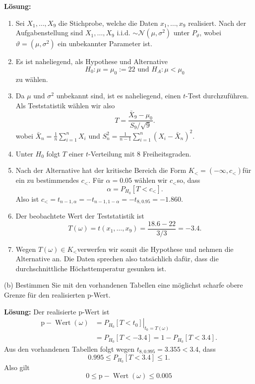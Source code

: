\textbf{Lösung:}
\begin{enumerate}[label=\roman*]
	\item Sei $X_{1}, \ldots, X_{9}$ die Stichprobe, welche die Daten $x_{1}, \ldots, x_{9}$ realisiert. Nach der Aufgabenstellung sind $X_{1}, \ldots, X_{9}$ i.i.d. $\sim \mathcal{N}\left(\mu, \sigma^{2}\right)$ unter $P_{\vartheta}$, wobei $\vartheta=\left(\mu, \sigma^{2}\right)$ ein unbekannter Parameter ist.
	\item Es ist naheliegend, als Hypothese und Alternative
$$
H_{0}: \mu=\mu_{0}:=22 \text { und } H_{A}: \mu<\mu_{0}
$$
zu wählen.
	\item Da $\mu$ und $\sigma^{2}$ unbekannt sind, ist es naheliegend, einen $t$-Test durchzuführen. Als Teststatistik wählen wir also
$$
T=\frac{\bar{X}_{9}-\mu_{0}}{S_{9} / \sqrt{9}} .
$$
wobei $\bar{X}_{n}=\frac{1}{n} \sum_{i=1}^{n} X_{i}$ und $S_{n}^{2}=\frac{1}{n-1} \sum_{i=1}^{n}\left(X_{i}-\bar{X}_{n}\right)^{2}$.
	\item Unter $H_{0}$ folgt $T$ einer $t$-Verteilung mit 8 Freiheitsgraden.
	\item Nach der Alternative hat der kritische Bereich die Form $K_{<}=\left(-\infty, c_{<}\right)$für ein zu bestimmendes $c_{<}$. Für $\alpha=0.05$ wählen wir $c_{<}$so, dass
	$$
	\alpha=P_{H_{0}}\left[T<c_{<}\right] .
	$$
	Also ist $c_{<}=t_{n-1, \alpha}=-t_{n-1,1-\alpha}=-t_{8,0.95}=-1.860$.
	\item Der beobachtete Wert der Teststatistik ist
	$$
	T(\omega)=t\left(x_{1}, \ldots, x_{9}\right)=\frac{18.6-22}{3 / 3}=-3.4 .
	$$
	\item Wegen $T(\omega) \in K_{<}$verwerfen wir somit die Hypothese und nehmen die Alternative an. Die Daten sprechen also tatsächlich dafür, dass die durchschnittliche Höchsttemperatur gesunken ist.
\end{enumerate}
(b) Bestimmen Sie mit den vorhandenen Tabellen eine möglichst scharfe obere Grenze für den realisierten p-Wert.

\textbf{Lösung:}
Der realisierte p-Wert ist
\begin{align*}
	\mathrm{p}-\operatorname{Wert}(\omega) & =\left.P_{H_{0}}\left[T<t_{0}\right]\right|_{t_{0}=T(\omega)}\\ & =P_{H_{0}}[T<-3.4]=1-P_{H_{0}}[T<3.4] .
\end{align*}
Aus den vorhandenen Tabellen folgt wegen $t_{8,0.995}=3.355<3.4$, dass
$$
0.995 \leq P_{H_{0}}[T<3.4] \leq 1 .
$$
Also gilt
$$
0 \leq \mathrm{p}-\operatorname{Wert}(\omega) \leq 0.005
$$
\hrulefill